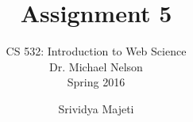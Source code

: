 \documentclass[envcountsame,envcountchap]{svmono}
\begin{document}
\author{Srividya Majeti}
\title{Assignment 5}

\subtitle{CS 532:  Introduction to Web Science\\Dr. Michael Nelson\\Spring 2016}

\maketitle

\frontmatter

\tableofcontents

\mainmatter




% 		

% 
\end{document}
